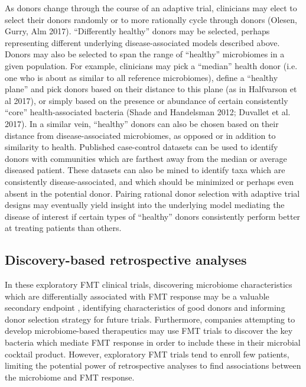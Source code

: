 As donors change through the course of an adaptive trial, clinicians may elect to select their donors randomly or to more rationally cycle through donors (Olesen, Gurry, Alm 2017). “Differently healthy” donors may be selected, perhaps representing different underlying disease-associated models described above. Donors may also be selected to span the range of “healthy” microbiomes in a given population. For example, clinicians may pick a “median” health donor (i.e. one who is about as similar to all reference microbiomes), define a “healthy plane” and pick donors based on their distance to this plane (as in Halfvarson et al 2017), or simply based on the presence or abundance of certain consistently “core” health-associated bacteria (Shade and Handelsman 2012; Duvallet et al. 2017). In a similar vein, “healthy” donors can also be chosen based on their distance from disease-associated microbiomes, as opposed or in addition to similarity to health. Published case-control datasets can be used to identify donors with communities which are farthest away from the median or average diseased patient. These datasets can also be mined to identify taxa which are consistently disease-associated, and which should be minimized or perhaps even absent in the potential donor. Pairing rational donor selection with adaptive trial designs may eventually yield insight into the underlying model mediating the disease of interest if certain types of “healthy” donors consistently perform better at treating patients than others.

\subsection{Discovery-based retrospective analyses}

In these exploratory FMT clinical trials, discovering microbiome characteristics which are differentially associated with FMT response may be a valuable secondary endpoint \cite{Olesen2018}, identifying characteristics of good donors and informing donor selection strategy for future trials.
Furthermore, companies attempting to develop microbiome-based therapeutics may use FMT trials to discover the key bacteria which mediate FMT response in order to include these in their microbial cocktail product.
However, exploratory FMT trials tend to enroll few patients, limiting the potential power of retrospective analyses to find associations between the microbiome and FMT response.

